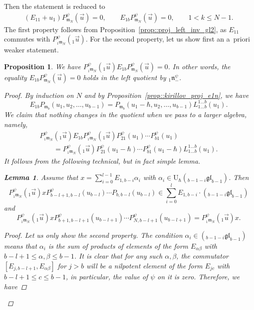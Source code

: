 \documentclass[10pt,a4paper]{article}
\numberwithin{equation}{section}
\newtheorem{Lemma}[Theorem]{Lemma}
\newtheorem{Proposition}[Theorem]{Proposition}
{ \theoremstyle{definition}
	\newtheorem{Definition}[Theorem]{Definition}
	\newtheorem{Note}[Theorem]{Note}
	\newtheorem{Example}[Theorem]{Example}
	\newtheorem{Remark}[Theorem]{Remark} }
\newcommand{\U}{\mathrm{U}_{\hbar}}
\newcommand{\n}{\mathfrak{n}}
\newcommand{\m}{\mathfrak{m}}
\newcommand{\gl}{\mathfrak{gl}}
\begin{document}
	Then the statement is reduced to
	\begin{align*}
			(E_{11} + u_1) P_{\m_N}^{\psi}(\vec{u}) = 0, \qquad
			E_{1b} P_{\m_N}^{\psi}(\vec{u}) = 0,\qquad 1< k \leq N-1.
	\end{align*}
	The first property follows from Proposition~\ref{prop::proj_left_inv_gl2}, as $E_{11}$ commutes with $P_{{}_1\m_{N}}^{\psi}({}_1\vec{u})$. For the second property, let us show first an a~priori weaker statement.
	\begin{Proposition}
		\label{prop::left_inv_proj_quotient}
		We have
$
		P_{{}_1\m_{N}}^{\psi}({}_1\vec{u}) E_{1b} P_{ \m_{N}}^{\psi}(\vec{u}) = 0$.
		In other words, the equality $E_{1b} P_{ \m_{N}}^{\psi}(\vec{u})\allowbreak=0$ holds in the left quotient by ${}_1\n_-^{\psi}$.
		\begin{proof}
			By induction on $N$ and by Proposition~\ref{prop::kirillov_proj_e1n}, we have
			\[
			E_{1b}P_{\m_b}(u_1,u_2,\dots,u_{b-1}) = P_{\m_b}(u_1-\hbar,u_2,\dots,u_{b-1}) L_{1\dots b}^{1\dots b} (u_1).
			\]
			We claim that nothing changes in the quotient when we pass to a larger algebra, namely,
			\begin{gather*}
				P_{{}_1\m_N}^{\psi}({}_1\vec{u}) E_{1b} P_{{}_1\m_N}^{\psi}({}_1\vec{u}) P_{21}^{\psi}(u_1) \cdots P_{b1}^{\psi}(u_1) \\
				\qquad=P_{{}_1\m_N}^{\psi}({}_1\vec{u}) P_{21}^{\psi}(u_1-\hbar) \cdots P_{b1}^{\psi}(u_1-\hbar) L_{1\dots b}^{1\dots b}(u_1).
			\end{gather*}
			It follows from the following technical, but in fact simple lemma.
			\begin{Lemma}
				Assume that $x = \sum_{i=0}^{l-1} E_{1,b-i} \alpha_i$ with $\alpha_i \in \U({}_{b-1-i} \gl_{b-1})$. Then
				\[
				P_{{}_1\m_{N}}^{\psi}({}_1\vec{u}) x P_{b-l+1,b-l}^{\psi} (u_{b-l}) \cdots P_{b,b-l}(u_{b-l}) \in \sum_{i=0}^{l} E_{1,b-i} \cdot ({}_{b-1-i} \gl_{b-1})
				\]
				and
				\[
				P_{{}_1\m_{N}}^{\psi}({}_1\vec{u}) x P_{b+1,b-l+1}^{\psi}(u_{b-l+1}) \cdots P_{N,b-l+1}^{\psi}(u_{b-l+1}) = P_{{}_1\m_{N}}^{\psi}({}_1\vec{u}) x.
				\]
				\begin{proof}
					Let us only show the second property. The condition $\alpha_i \in ({}_{b-1-i} \gl_{b-1})$ means that $\alpha_i$ is the sum of products of elements of the form $E_{\alpha\beta}$ with $b-l+1 \leq \alpha,\beta \leq b-1$. It is clear that for any such $\alpha,\beta$, the commutator $[E_{j,b-l+1},E_{\alpha \beta}]$ for $j>b$ will be a nilpotent element of the form $E_{jc}$ with $b-l+1 \leq c \leq b-1$, in particular, the value of $\psi$ on it is zero. Therefore, we have

\end{proof}
\end{Lemma}
\end{proof}
\end{Proposition}
\end{document}
